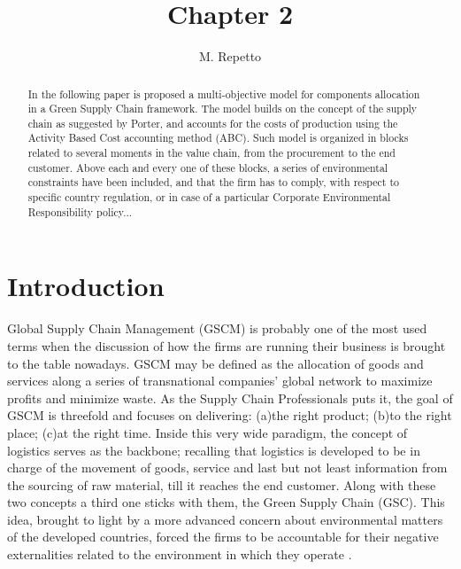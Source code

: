 \documentclass{article}
\begin{document}
  \title{Chapter 2}

  \author{M. Repetto}

  \date{}

\maketitle

\begin{abstract}
  In the following paper is proposed a multi-objective model for components allocation in a Green Supply Chain framework. The model builds on the concept of the supply chain as suggested by Porter, and accounts for the costs of production using the Activity Based Cost accounting method (ABC). Such model is organized in blocks related to several moments in the value chain, from the procurement to the end customer. Above each and every one of these blocks, a series of environmental constraints have been included, and that the firm has to comply, with respect to specific country regulation, or in case of a particular Corporate Environmental Responsibility policy...
\end{abstract}

\section{Introduction}
  Global Supply Chain Management (GSCM) is probably one of the most used terms when the discussion of how the firms are running their business is brought to the table nowadays. GSCM may be defined as the allocation of goods and services along a series of transnational companies' global network to maximize profits and minimize waste. As the Supply Chain Professionals puts it, the goal of GSCM is threefold and focuses on delivering: (a)the right product; (b)to the right place; (c)at the right time.
  Inside this very wide paradigm, the concept of logistics serves as the backbone; recalling that logistics is developed to be in charge of the movement of goods, service and last but not least information from the sourcing of raw material, till it reaches the end customer.
  Along with these two concepts a third one sticks with them, the Green Supply Chain (GSC). This idea, brought to light by a more advanced concern about environmental matters of the developed countries, forced the firms to be accountable for their negative externalities related to the environment in which they operate \cite{srivastava_green_2007}.
\end{document}
